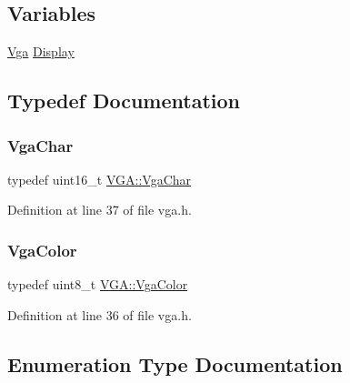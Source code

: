 \subsection*{Variables}
\begin{DoxyCompactItemize}
\item 
\hyperlink{class_v_g_a_1_1_vga}{Vga} \hyperlink{namespace_v_g_a_a97690b6d72f447f3e5e1b744af8f47fe}{Display}
\end{DoxyCompactItemize}


\subsection{Typedef Documentation}
\mbox{\label{namespace_v_g_a_adb876ce4a116e09f39708ca16ef25f74}} 
\subsubsection{\texorpdfstring{Vga\+Char}{VgaChar}}
{\footnotesize\ttfamily typedef uint16\+\_\+t \hyperlink{namespace_v_g_a_adb876ce4a116e09f39708ca16ef25f74}{V\+G\+A\+::\+Vga\+Char}}



Definition at line 37 of file vga.\+h.

\mbox{\label{namespace_v_g_a_afa3882cddefd08a3f33aaf6fcbcbcd7f}} 
\subsubsection{\texorpdfstring{Vga\+Color}{VgaColor}}
{\footnotesize\ttfamily typedef uint8\+\_\+t \hyperlink{namespace_v_g_a_afa3882cddefd08a3f33aaf6fcbcbcd7f}{V\+G\+A\+::\+Vga\+Color}}



Definition at line 36 of file vga.\+h.



\subsection{Enumeration Type Documentation}
\mbox{\label{namespace_v_g_a_ace1c3156a8d3975ff783ff7a1fa8eb71}} 
